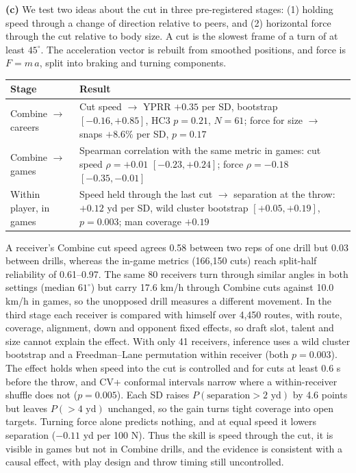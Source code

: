 \documentclass[11pt]{article}
\begin{document}
\noindent\textbf{(c)}
We test two ideas about the cut in three pre-registered stages: (1) holding speed through a change of direction relative to peers, and (2) horizontal force through the cut relative to body size. A cut is the slowest frame of a turn of at least $45^\circ$. The acceleration vector is rebuilt from smoothed positions, and force is $F = m\,a$, split into braking and turning components.

\begin{center}
\small
\setlength{\tabcolsep}{4pt}
\begin{tabular}{p{}p{}}
\toprule
\textbf{Stage} & \textbf{Result} \\
\midrule
Combine $\to$ careers & Cut speed $\to$ YPRR $+0.35$ per SD, bootstrap $[-0.16, +0.85]$, HC3 $p = 0.21$, $N = 61$; force for size $\to$ snaps $+8.6\%$ per SD, $p = 0.17$ \\
Combine $\to$ games & Spearman correlation with the same metric in games: cut speed $\rho = +0.01$ $[-0.23, +0.24]$; force $\rho = -0.18$ $[-0.35, -0.01]$ \\
Within player, in games & Speed held through the last cut $\to$ separation at the throw: $+0.12$ yd per SD, wild cluster bootstrap $[+0.05, +0.19]$, $p = 0.003$; man coverage $+0.19$ \\
\bottomrule
\end{tabular}
\end{center}

A receiver's Combine cut speed agrees 0.58 between two reps of one drill but 0.03 between drills, whereas the in-game metrics (166,150 cuts) reach split-half reliability of 0.61--0.97. The same 80 receivers turn through similar angles in both settings (median $61^\circ$) but carry 17.6 km/h through Combine cuts against 10.0 km/h in games, so the unopposed drill measures a different movement. In the third stage each receiver is compared with himself over 4,450 routes, with route, coverage, alignment, down and opponent fixed effects, so draft slot, talent and size cannot explain the effect. With only 41 receivers, inference uses a wild cluster bootstrap and a Freedman--Lane permutation within receiver (both $p = 0.003$). The effect holds when speed into the cut is controlled and for cuts at least 0.6 s before the throw, and CV+ conformal intervals narrow where a within-receiver shuffle does not ($p = 0.005$). Each SD raises $P(\text{separation} > 2\text{ yd})$ by 4.6 points but leaves $P(> 4\text{ yd})$ unchanged, so the gain turns tight coverage into open targets. Turning force alone predicts nothing, and at equal speed it lowers separation ($-0.11$ yd per 100 N). Thus the skill is speed through the cut, it is visible in games but not in Combine drills, and the evidence is consistent with a causal effect, with play design and throw timing still uncontrolled.
\end{document}
